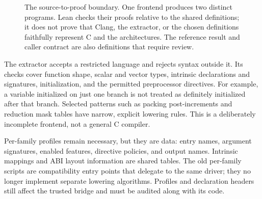 \documentclass[11pt]{article}
\begin{document}
\begin{figure}[htbp]
\centering
{}
\caption{The source-to-proof boundary. One frontend produces two distinct programs. Lean checks their proofs relative to the shared definitions; it does not prove that Clang, the extractor, or the chosen definitions faithfully represent C and the architectures. The reference result and caller contract are also definitions that require review.}
\label{fig:architecture}
\end{figure}

The extractor accepts a restricted language and rejects syntax outside it. Its checks cover function shape, scalar and vector types, intrinsic declarations and signatures, initialization, and the permitted preprocessor directives. For example, a variable initialized on just one branch is not treated as definitely initialized after that branch. Selected patterns such as packing post-increments and reduction mask tables have narrow, explicit lowering rules. This is a deliberately incomplete frontend, not a general C compiler.

Per-family profiles remain necessary, but they are data: entry names, argument signatures, enabled features, directive policies, and output names. Intrinsic mappings and ABI layout information are shared tables. The old per-family scripts are compatibility entry points that delegate to the same driver; they no longer implement separate lowering algorithms. Profiles and declaration headers still affect the trusted bridge and must be audited along with its code.
\end{document}
